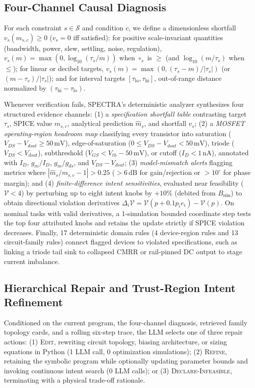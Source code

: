 \subsection{Four-Channel Causal Diagnosis}
\label{sec:diag}
For each constraint $s \in \mathcal{S}$ and condition $c$, we define a dimensionless shortfall $v_s(m_{s,c}) \ge 0$ ($v_s = 0$ iff satisfied): for positive scale-invariant quantities (bandwidth, power, slew, settling, noise, regulation), $v_s(m) = \max(0, \log_{10}(\tau_s / m))$ when $\circ_s$ is $\ge$ (and $\log_{10}(m / \tau_s)$ when $\le$); for linear or decibel targets, $v_s(m) = \max(0, (\tau_s - m)/|\tau_s|)$ (or $(m - \tau_s)/|\tau_s|$); and for interval targets $[\tau_{\text{lo}}, \tau_{\text{hi}}]$, out-of-range distance normalized by $(\tau_{\text{hi}} - \tau_{\text{lo}})$.

Whenever verification fails, \textsc{SPECTRA}'s deterministic analyzer synthesizes four structured evidence channels:
(1) a \emph{specification shortfall table} contrasting target $\tau_s$, SPICE value $m_{s,c}$, analytical prediction $\hat{m}_s$, and shortfall $v_s$;
(2) a \emph{MOSFET operating-region headroom map} classifying every transistor into saturation ($V_{DS} - V_{dsat} \ge 50\,\mathrm{mV}$), edge-of-saturation ($0 \le V_{DS} - V_{dsat} < 50\,\mathrm{mV}$), triode ($V_{DS} < V_{dsat}$), subthreshold ($V_{GS} < V_{th} - 50\,\mathrm{mV}$), or cutoff ($I_D < 1\,\mathrm{nA}$), annotated with $I_D$, $g_m/I_D$, $g_m/g_{ds}$, and $V_{DS} - V_{dsat}$;
(3) \emph{model-mismatch alerts} flagging metrics where $|\hat{m}_s / m_{s,c} - 1| > 0.25$ ($>6\,\mathrm{dB}$ for gain/rejection or $>10^\circ$ for phase margin); and
(4) \emph{finite-difference intent sensitivities}, evaluated near feasibility ($\mathcal{V} < 4$) by perturbing up to eight intent knobs by $+10\%$ (debited from $B_{\text{sim}}$) to obtain directional violation derivatives $\Delta_i \mathcal{V} = \mathcal{V}(p + 0.1 p_i e_i) - \mathcal{V}(p)$.
On nominal tasks with valid derivatives, a 1-simulation bounded coordinate step tests the top four attributed knobs and retains the update strictly if SPICE violation decreases. Finally, 17 deterministic domain rules (4 device-region rules and 13 circuit-family rules) connect flagged devices to violated specifications, such as linking a triode tail sink to collapsed CMRR or rail-pinned DC output to stage current imbalance.

\subsection{Hierarchical Repair and Trust-Region Intent Refinement}
\label{sec:refine}
Conditioned on the current program, the four-channel diagnosis, retrieved family topology cards, and a rolling six-step trace, the LLM selects one of three repair actions:
(1) \textsc{Edit}, rewriting circuit topology, biasing architecture, or sizing equations in Python (1 LLM call, 0 optimization simulations);
(2) \textsc{Refine}, retaining the symbolic program while optionally updating parameter bounds and invoking continuous intent search (0 LLM calls); or
(3) \textsc{Declare-Infeasible}, terminating with a physical trade-off rationale.

